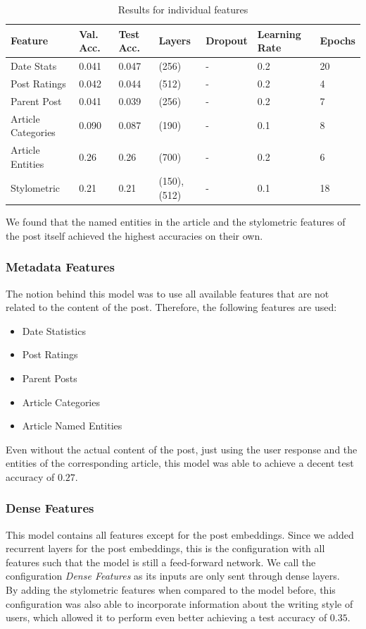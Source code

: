\documentclass[acmsmall]{acmart}
\begin{document}
\begin{table}[H]
\begin{tabular}{lllllll}
Feature & Val. Acc. & Test Acc. & Layers & Dropout & Learning Rate & Epochs\\ \hline
Date Stats & 0.041 & 0.047 & (256) & - & 0.2 & 20 \\
Post Ratings & 0.042 & 0.044 & (512) & - & 0.2 & 4 \\
Parent Post & 0.041 & 0.039 & (256) & - & 0.2 & 7 \\
Article Categories & 0.090 & 0.087 & (190) & - & 0.1 & 8 \\
Article Entities & 0.26 & 0.26 &  (700)  & - & 0.2 & 6 \\
Stylometric & 0.21 & 0.21 & (150),(512) & - & 0.1 & 18 
\end{tabular}
\caption{Results for individual features}
\label{tab:result_features}
\end{table}

We found that the named entities in the article and the stylometric features of the post itself achieved the highest accuracies on their own.

\subsubsection{Metadata Features}
The notion behind this model was to use all available features that are not related to the content of the post. Therefore, the following features are used:
\begin{itemize}
\item Date Statistics
\item Post Ratings
\item Parent Posts
\item Article Categories
\item Article Named Entities
\end{itemize}
Even without the actual content of the post, just using the user response and the entities of the corresponding article, this model was able to achieve a decent test accuracy of $0.27$. 

\subsubsection{Dense Features}
This model contains all features except for the post embeddings. Since we added recurrent layers for the post embeddings, this is the configuration with all features such that the model is still a feed-forward network. We call the configuration \textit{Dense Features} as its inputs are only sent through dense layers. \\
By adding the stylometric features when compared to the model before, this configuration was also able to incorporate information about the writing style of users, which allowed it to perform even better achieving a test accuracy of $0.35$.
\end{document}
